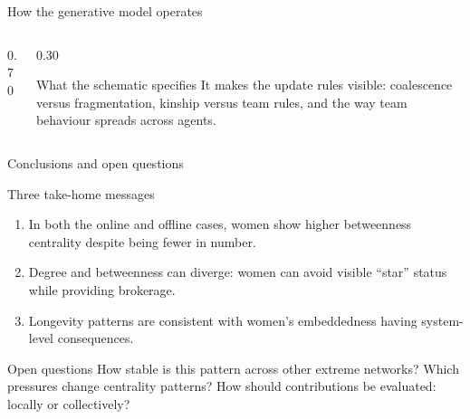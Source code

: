 \begin{frame}{How the generative model operates}
  \small
  \begin{columns}[T,onlytextwidth]
    \begin{column}{0.70\textwidth}
    \end{column}

    \begin{column}{0.30\textwidth}
      \begin{block}{What the schematic specifies}
        It makes the update rules visible: coalescence versus fragmentation, kinship versus team rules, and the way team behaviour spreads across agents.
      \end{block}
    \end{column}
  \end{columns}

\end{frame}

\begin{frame}{Conclusions and open questions}
  \begin{block}{Three take-home messages}
    \begin{enumerate}
      \item In both the online and offline cases, women show higher \alert{betweenness centrality} despite being fewer in number.
      \item Degree and betweenness can diverge: women can avoid visible “star” status while providing brokerage.
      \item Longevity patterns are consistent with women's embeddedness having system-level consequences.
    \end{enumerate}
  \end{block}

  \begin{exampleblock}{Open questions}
    How stable is this pattern across other extreme networks? Which pressures change centrality patterns? How should contributions be evaluated: locally or collectively?
  \end{exampleblock}

\end{frame}


